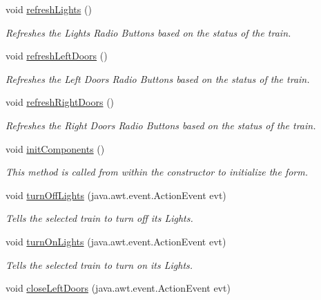\begin{DoxyCompactItemize}
void \hyperlink{classTrainControllerComps_1_1TCUtilityPanel_a711d130d4d9c3e9c7d7513237da7bc47}{refresh\+Lights} ()
\begin{DoxyCompactList}\small\item\em Refreshes the Lights Radio Buttons based on the status of the train. \end{DoxyCompactList}\item 
void \hyperlink{classTrainControllerComps_1_1TCUtilityPanel_a698bd8e8a0c6cf25d9b4cfe38ce84504}{refresh\+Left\+Doors} ()
\begin{DoxyCompactList}\small\item\em Refreshes the Left Doors Radio Buttons based on the status of the train. \end{DoxyCompactList}\item 
void \hyperlink{classTrainControllerComps_1_1TCUtilityPanel_a8e57927dc2172cb80867b2c0582a946e}{refresh\+Right\+Doors} ()
\begin{DoxyCompactList}\small\item\em Refreshes the Right Doors Radio Buttons based on the status of the train. \end{DoxyCompactList}\item 
void \hyperlink{classTrainControllerComps_1_1TCUtilityPanel_aec618c0214d08262c146d7f941d0ce82}{init\+Components} ()
\begin{DoxyCompactList}\small\item\em This method is called from within the constructor to initialize the form. \end{DoxyCompactList}\item 
void \hyperlink{classTrainControllerComps_1_1TCUtilityPanel_a7cbaee81557b189ec438ce2bfa954c32}{turn\+Off\+Lights} (java.\+awt.\+event.\+Action\+Event evt)
\begin{DoxyCompactList}\small\item\em Tells the selected train to turn off its Lights. \end{DoxyCompactList}\item 
void \hyperlink{classTrainControllerComps_1_1TCUtilityPanel_ab82461760b088e289135115a3e038bc9}{turn\+On\+Lights} (java.\+awt.\+event.\+Action\+Event evt)
\begin{DoxyCompactList}\small\item\em Tells the selected train to turn on its Lights. \end{DoxyCompactList}\item 
void \hyperlink{classTrainControllerComps_1_1TCUtilityPanel_ab732c67358000f2bfc41eb128eab0e46}{close\+Left\+Doors} (java.\+awt.\+event.\+Action\+Event evt)

\end{DoxyCompactItemize}
